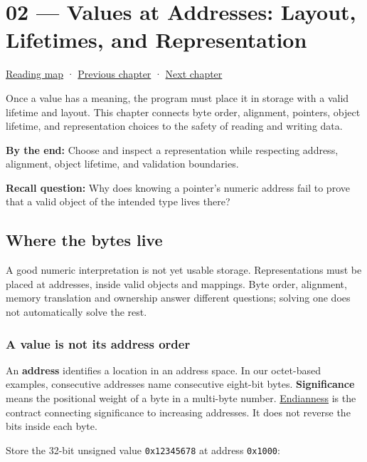 \hypertarget{01-foundations-i-ch002}{}
\chapter{02 --- Values at Addresses: Layout, Lifetimes, and Representation}\label{01-foundations-i-ch002-values-at-addresses-layout-lifetimes-and-representation}

\hyperref[volume-reading-map]{Reading map} · \hyperref[01-foundations-i-ch001]{Previous chapter} · \hyperref[01-foundations-i-ch003]{Next chapter}

Once a value has a meaning, the program must place it in storage with a valid lifetime and layout. This chapter connects byte order, alignment, pointers, object lifetime, and representation choices to the safety of reading and writing data.

\textbf{By the end:} Choose and inspect a representation while respecting address, alignment, object lifetime, and validation boundaries.

\textbf{Recall question:} Why does knowing a pointer's numeric address fail to prove that a valid object of the intended type lives there?

\section{Where the bytes live}\label{01-foundations-i-ch002-where-the-bytes-live}

A good numeric interpretation is not yet usable storage. Representations must be placed at addresses, inside valid objects and mappings. Byte order, alignment, memory translation and ownership answer different questions; solving one does not automatically solve the rest.

\subsection{A value is not its address order}\label{01-foundations-i-ch002-a-value-is-not-its-address-order}

An \textbf{address} identifies a location in an address space. In our octet-based examples, consecutive addresses name consecutive eight-bit bytes. \textbf{Significance} means the positional weight of a byte in a multi-byte number. \hyperref[appendix-bc07c3d25b18]{Endianness} is the contract connecting significance to increasing addresses. It does not reverse the bits inside each byte.

Store the 32-bit unsigned value \texttt{0x12345678} at address \texttt{0x1000}:

